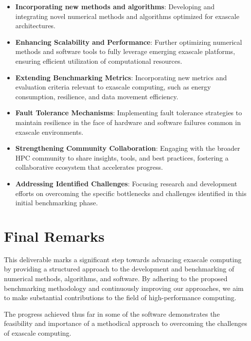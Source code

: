\begin{itemize}
    \item \textbf{Incorporating new methods and algorithms}: Developing and integrating novel numerical methods and algorithms optimized for exascale architectures.
    \item \textbf{Enhancing Scalability and Performance}: Further optimizing numerical methods and software tools to fully leverage emerging exascale platforms, ensuring efficient utilization of computational resources.
    
    \item \textbf{Extending Benchmarking Metrics}: Incorporating new metrics and evaluation criteria relevant to exascale computing, such as energy consumption, resilience, and data movement efficiency.
    \item \textbf{Fault Tolerance Mechanisms}: Implementing fault tolerance strategies to maintain resilience in the face of hardware and software failures common in exascale environments.
    \item \textbf{Strengthening Community Collaboration}: Engaging with the broader HPC community to share insights, tools, and best practices, fostering a collaborative ecosystem that accelerates progress.
    \item \textbf{Addressing Identified Challenges}: Focusing research and development efforts on overcoming the specific bottlenecks and challenges identified in this initial benchmarking phase.
\end{itemize}

\section*{Final Remarks}

This deliverable marks a significant step towards advancing exascale computing by providing a structured approach to the development and benchmarking of numerical methods, algorithms, and software. By adhering to the proposed benchmarking methodology and continuously improving our approaches, we aim to make substantial contributions to the field of high-performance computing.

The progress achieved thus far in some of the software demonstrates the feasibility and importance of a methodical approach to overcoming the challenges of exascale computing. 


